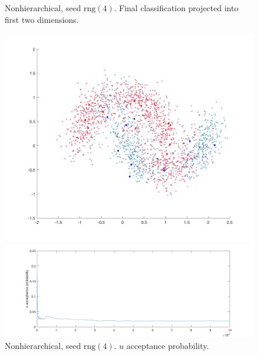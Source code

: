 \documentclass{siamart1116}
\begin{document}
\begin{figure}[!htb]
\begin{minipage}{0.48\textwidth}
    \centering
    \caption{\label{fig:moons_nonhier2_scatter} Nonhierarchical, seed $\text{rng}(4)$. Final classification projected into first two dimensions.}
    \includegraphics[width=\linewidth]{moons/nonhier2/scatter.png}
\end{minipage} \hfill
\begin{minipage}{0.48\textwidth}
    \centering
    \caption{\label{fig:moons_nonhier2_u_accept} Nonhierarchical, seed $\text{rng}(4)$. $u$ acceptance probability.}
    \includegraphics[width=\linewidth]{moons/nonhier2/u_accept.png}
\end{minipage}
\end{figure}
\end{document}
